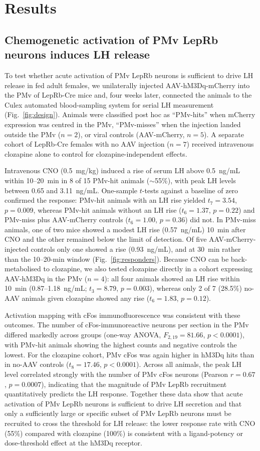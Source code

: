 \documentclass[11pt]{article}
\begin{document}
\section{Results}

\subsection{Chemogenetic activation of PMv LepRb neurons induces LH release}
To test whether acute activation of PMv LepRb neurons is sufficient to drive LH release in fed adult females, we unilaterally injected AAV-hM3Dq-mCherry into the PMv of LepRb-Cre mice and, four weeks later, connected the animals to the Culex automated blood-sampling system for serial LH measurement (Fig.~\ref{fig:design}). Animals were classified post hoc as ``PMv-hits'' when mCherry expression was centred in the PMv, ``PMv-misses'' when the injection landed outside the PMv ($n=2$), or viral controls (AAV-mCherry, $n=5$). A separate cohort of LepRb-Cre females with no AAV injection ($n=7$) received intravenous clozapine alone to control for clozapine-independent effects.

Intravenous CNO (0.5~mg/kg) induced a rise of serum LH above 0.5~ng/mL within 10--20~min in 8 of 15 PMv-hit animals ($\sim$55\%), with peak LH levels between 0.65 and 3.11~ng/mL. One-sample $t$-tests against a baseline of zero confirmed the response: PMv-hit animals with an LH rise yielded $t_{7}=3.54$, $p=0.009$, whereas PMv-hit animals without an LH rise ($t_{6}=1.37$, $p=0.22$) and PMv-miss plus AAV-mCherry controls ($t_{6}=1.00$, $p=0.36$) did not. In PMv-miss animals, one of two mice showed a modest LH rise (0.57~ng/mL) 10~min after CNO and the other remained below the limit of detection. Of five AAV-mCherry-injected controls only one showed a rise (0.93~ng/mL), and at 30~min rather than the 10--20-min window (Fig.~\ref{fig:responders}). Because CNO can be back-metabolised to clozapine, we also tested clozapine directly in a cohort expressing AAV-hM3Dq in the PMv ($n=4$): all four animals showed an LH rise within 10~min (0.87--1.18~ng/mL; $t_{3}=8.79$, $p=0.003$), whereas only 2 of 7 (28.5\%) no-AAV animals given clozapine showed any rise ($t_{6}=1.83$, $p=0.12$).

Activation mapping with cFos immunofluorescence was consistent with these outcomes. The number of cFos-immunoreactive neurons per section in the PMv differed markedly across groups (one-way ANOVA, $F_{2,19}=81.66$, $p<0.0001$), with PMv-hit animals showing the highest counts and negative controls the lowest. For the clozapine cohort, PMv cFos was again higher in hM3Dq hits than in no-AAV controls ($t_{8}=17.46$, $p<0.0001$). Across all animals, the peak LH level correlated strongly with the number of PMv cFos neurons (Pearson $r=0.67$, $p=0.0007$), indicating that the magnitude of PMv LepRb recruitment quantitatively predicts the LH response. Together these data show that acute activation of PMv LepRb neurons is sufficient to drive LH secretion and that only a sufficiently large or specific subset of PMv LepRb neurons must be recruited to cross the threshold for LH release: the lower response rate with CNO (55\%) compared with clozapine (100\%) is consistent with a ligand-potency or dose-threshold effect at the hM3Dq receptor.
\end{document}
